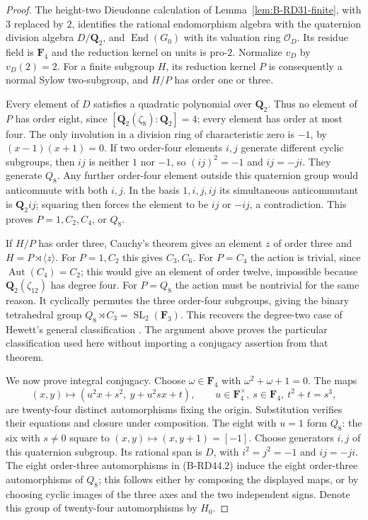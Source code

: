 \begin{proof}
The height-two Dieudonne calculation of Lemma~\ref{lem:B-RD31-finite},
with $3$ replaced by $2$, identifies the rational endomorphism algebra
with the quaternion division algebra $D/\mathbf Q_2$, and
$\operatorname{End}(G_0)$ with its valuation ring $\mathcal O_D$.
Its residue field is $\mathbf F_4$ and the reduction kernel on units
is pro-$2$. Normalize $v_D$ by $v_D(2)=2$.
For a finite subgroup $H$, its reduction kernel $P$ is consequently
a normal Sylow two-subgroup, and $H/P$ has order one or three.

Every element of $D$ satisfies a quadratic polynomial over $\mathbf Q_2$.
Thus no element of $P$ has order eight, since
$[\mathbf Q_2(\zeta_8):\mathbf Q_2]=4$; every element has order at
most four. The only involution in a division ring of characteristic
zero is $-1$, by $(x-1)(x+1)=0$.
If two order-four elements $i,j$ generate different cyclic subgroups,
then $ij$ is neither $1$ nor $-1$, so $(ij)^2=-1$ and $ij=-ji$.
They generate $Q_8$. Any further order-four element outside this
quaternion group would anticommute with both $i,j$. In the basis
$1,i,j,ij$ its simultaneous anticommutant is $\mathbf Q_2ij$;
squaring then forces the element to be $ij$ or $-ij$, a contradiction.
This proves $P=1,C_2,C_4$, or $Q_8$.

If $H/P$ has order three, Cauchy's theorem gives an element $z$ of
order three and $H=P\rtimes\langle z\rangle$.
For $P=1,C_2$ this gives $C_3,C_6$.
For $P=C_4$ the action is trivial, since
$\operatorname{Aut}(C_4)=C_2$; this would give an element of order
twelve, impossible because $\mathbf Q_2(\zeta_{12})$ has degree four.
For $P=Q_8$ the action must be nontrivial for the same reason.
It cyclically permutes the three order-four subgroups, giving the
binary tetrahedral group $Q_8\rtimes C_3=\operatorname{SL}_2(\mathbf F_3)$.
This recovers the degree-two case of Hewett's general classification
\cite[Theorem~1.4 and Corollary~1.5, p.~520]{Hewett1995Division}.
The argument above proves the particular classification used here
without importing a conjugacy assertion from that theorem.

We now prove integral conjugacy. Choose $\omega\in\mathbf F_4$
with $\omega^2+\omega+1=0$. The maps
\[
 (x,y)\longmapsto
 (u^2x+s^2,\ y+u^2sx+t),\qquad
 u\in\mathbf F_4^\times,\ s\in\mathbf F_4,\ t^2+t=s^3,
 \tag{B-RD44.2}
\]
are twenty-four distinct automorphisms fixing the origin.
Substitution verifies their equations and closure under composition.
The eight with $u=1$ form $Q_8$: the six with $s\ne0$ square
to $(x,y)\mapsto(x,y+1)=[-1]$.
Choose generators $i,j$ of this quaternion subgroup.
Its rational span is $D$, with $i^2=j^2=-1$ and $ij=-ji$.
The eight order-three automorphisms in (B-RD44.2) induce the eight
order-three automorphisms of $Q_8$; this follows either by composing
the displayed maps, or by choosing cyclic images of the three axes
and the two independent signs. Denote this group of twenty-four
automorphisms by $H_0$.


\end{proof}
